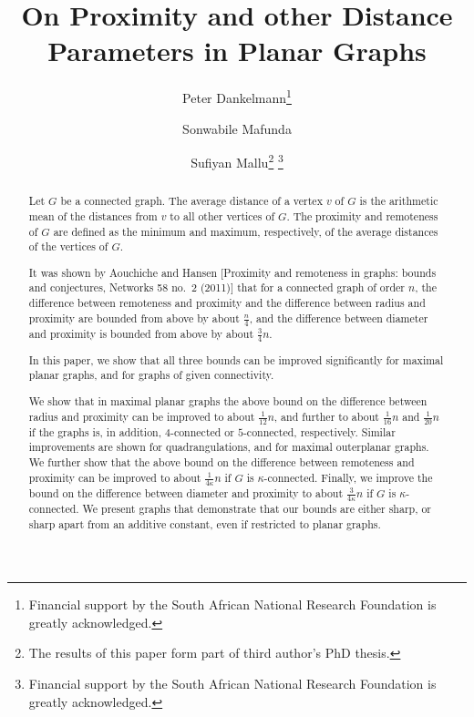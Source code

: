\documentclass[a4paper,11pt]{article}
\begin{document}
\title{On Proximity and other Distance Parameters in Planar Graphs}

\author[1]{Peter Dankelmann\thanks{Financial support by the South African National Research Foundation is greatly acknowledged.}}
\author[1,2]{Sonwabile Mafunda}
\author[1]{Sufiyan Mallu\thanks{The results of this paper form part of third author's PhD thesis.}
\thanks{Financial support by the South African National Research Foundation is greatly acknowledged.}}


\maketitle

\begin{abstract}
Let $G$ be a connected graph. The average distance of a vertex $v$ of $G$ is the arithmetic mean of the distances 
from $v$ to all other vertices of $G$. The proximity and remoteness of $G$ are defined as the 
minimum and maximum, respectively, of the average distances of the vertices of $G$.

It was shown by Aouchiche and Hansen [Proximity and remoteness in graphs: bounds and conjectures, Networks 58 no.\ 2 (2011)]
that for a connected graph of order $n$, the difference between remoteness and proximity and the difference
between radius and proximity are bounded from above by about $\frac{n}{4}$, and the difference between 
diameter and proximity is bounded from above by about $\frac{3}{4}n$.  

In this paper, we show that all three bounds can be improved significantly for maximal planar graphs, and for graphs
of given connectivity. 

We show that in maximal planar graphs the above bound on the difference between radius and proximity 
can be improved to about $\frac{1}{12}n$, 
and further to about $\frac{1}{16}n$ and $\frac{1}{20}n$ if the graphs is, in addition, $4$-connected or
$5$-connected, respectively. Similar improvements are shown for quadrangulations, and for maximal outerplanar graphs. 
We further show that the above bound on the difference between remoteness and proximity can be improved 
to about $\frac{1}{4\kappa}n$ if $G$ is $\kappa$-connected. 
Finally, we improve the bound on the difference between diameter and proximity to about $\frac{3}{4\kappa}n$ if $G$ is $\kappa$-connected. 
We present graphs that demonstrate that our bounds are either sharp, or sharp apart from an additive constant, 
even if restricted to planar graphs.  
\end{abstract}
\end{document}
